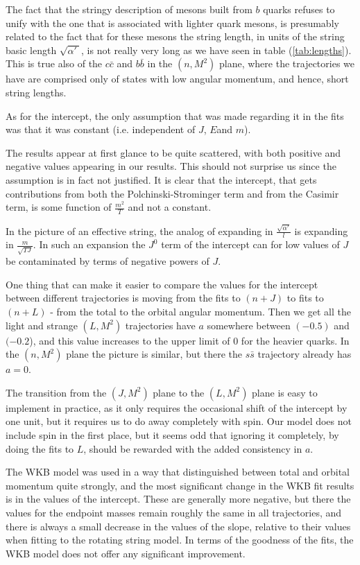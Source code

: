 \documentclass[11pt,a4]{article}
\newcommand{\alp}{\ensuremath{\alpha'\:}}
\newcommand{\ssb}{s\bar{s}}
\newcommand{\ccb}{c\bar{c}}
\newcommand{\bbb}{b\bar{b}}
\begin{document}
The fact that the stringy description of mesons built from $b$ quarks refuses to unify with the one that is  associated with lighter quark mesons, is presumably related to the fact that for these mesons the string length, in units of the string basic length $\sqrt{\alp}$, is not really very long as we have seen in table (\ref{tab:lengths}). This is true also of the \(\ccb\) and \(\bbb\) in the \((n,M^2)\) plane, where the trajectories we have are comprised only of states with low angular momentum, and hence, short string lengths.


As for the intercept, the only assumption that was made regarding it in the fits was that it was constant (i.e. independent of \(J\), \(E\)and \(m\)).


The results appear at first glance to be quite scattered, with both positive and negative values appearing in our results.  This should not surprise us since the assumption is in fact not justified. It is clear that the intercept, that gets contributions from both the Polchinski-Strominger term and from the Casimir term, is some function of $\frac{m^2}{T}$ and not a constant.


In the picture of an effective string, the analog of expanding in $\frac{\sqrt{\alpha'}}{l}$ is expanding in $\frac{m}{\sqrt{TJ}}$\cite{AHSY}. In such an expansion the $J^0$ term of the intercept can for low values of $J$ be contaminated by terms of negative powers of $J$.


One thing that can make it easier to compare the values for the intercept between different trajectories is moving from the fits to \((n+J)\) to fits to \((n+L)\) - from the total to the orbital angular momentum. Then we get all the light and strange \((L,M^2)\) trajectories have \(a\) somewhere between \((-0.5)\) and \((-0.2\)), and this value increases to the upper limit of \(0\) for the heavier quarks. In the \((n,M^2)\) plane the picture is similar, but there the \(\ssb\) trajectory already has \(a = 0\).


The transition from the \((J,M^2)\) plane to the \((L,M^2)\) plane is easy to implement in practice, as it only requires the occasional shift of the intercept by one unit, but it requires us to do away completely with spin. Our model does not include spin in the first place, but it seems odd that ignoring it completely, by doing the fits to \(L\), should be rewarded with the added consistency in \(a\).


The WKB model was used in a way that distinguished between total and orbital momentum quite strongly, and the most significant change in the WKB fit results is in the values of the intercept. These are generally more negative, but there the values for the endpoint masses remain roughly the same in all trajectories, and there is always a small decrease in the values of the slope, relative to their values when fitting to the rotating string model. In terms of the goodness of the fits, the WKB model does not offer any significant improvement.
\end{document}
